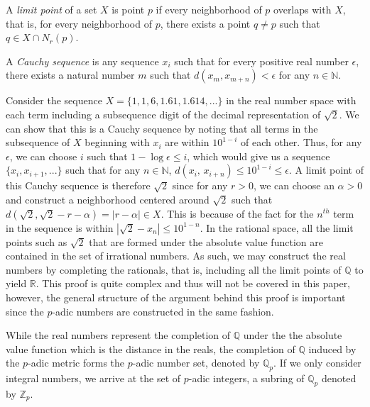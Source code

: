 \documentclass[a4paper]{article}
\begin{document}
\begin{definition}{}
A \textit{limit point} of a set $X$ is point $p$ if every neighborhood of $p$ overlaps with $X$, that is, for every neighborhood of $p$, there exists a point $q\neq p$ such that $q \in X \cap N_r(p)$.
\end{definition}

\begin{definition}{}
A \textit{Cauchy sequence} is any sequence ${x_i}$ such that for every positive real number $\epsilon$, there exists a natural number $m$ such that $d(x_m, x_{m+n})< \epsilon$ for any $n \in \mathbb{N}$.
\end{definition}

Consider the sequence $X=\{1, 1,6, 1.61, 1.614,...\}$ in the real number space with each term including a subsequence digit of the decimal representation of $\sqrt{2}$. We can show that this is a Cauchy sequence by noting that all terms in the subsequence of $X$ beginning with $x_i$ are within $10^{1-i}$ of each other. Thus, for any $\epsilon$, we can choose $i$ such that $1-\log{\epsilon} \leq i$, which would give us a sequence $\{x_i, x_{i+1},...\}$ such that for any $n \in \mathbb{N}$, $d(x_i,\, x_{i+n}) \leq 10^{1-i} \leq \epsilon$. A limit point of this Cauchy sequence is therefore $\sqrt{2}$ since for any $r>0$, we can choose an $\alpha > 0 $ and construct a neighborhood centered around $\sqrt{2}$ such that $d(\sqrt{2}, \sqrt{2}-r-\alpha) = |r-\alpha| \in X$. This is because of the fact for the $n^{th}$ term in the sequence is within $|\sqrt{2}- x_n| \leq 10^{1-n}$. In the rational space, all the limit points such as $\sqrt{2}$ that are formed under the absolute value function are contained in the set of irrational numbers. As such, we may construct the real numbers by completing the rationals, that is, including all the limit points of $\mathbb{Q}$ to yield $\mathbb{R}$. This proof is quite complex and thus will not be covered in this paper, however, the general structure of the argument behind this proof is important since the $p$-adic numbers are constructed in the same fashion. 

While the real numbers represent the completion of $\mathbb{Q}$ under the the absolute value function which is the distance in the reals, the completion of $\mathbb{Q}$ induced by the $p$-adic metric forms the $p$-adic number set, denoted by $\mathbb{Q}_{p}$. If we only consider integral numbers, we arrive at the set of $p$-adic integers, a subring of $\mathbb{Q}_p$ denoted by $\mathbb{Z}_p$.
\end{document}
